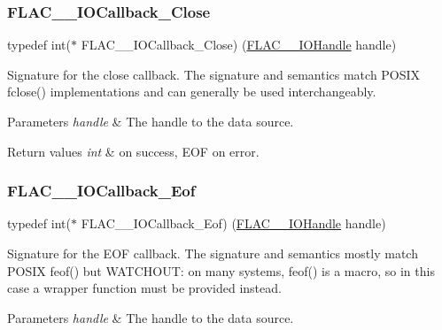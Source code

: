 \subsubsection{\texorpdfstring{F\+L\+A\+C\+\_\+\+\_\+\+I\+O\+Callback\+\_\+\+Close}{FLAC\_\_IOCallback\_Close}}
{\footnotesize\ttfamily typedef int($\ast$ F\+L\+A\+C\+\_\+\+\_\+\+I\+O\+Callback\+\_\+\+Close) (\hyperlink{group__flac__callbacks_ga4c329c3168dee6e352384c5e9306260d}{F\+L\+A\+C\+\_\+\+\_\+\+I\+O\+Handle} handle)}

Signature for the close callback. The signature and semantics match P\+O\+S\+IX fclose() implementations and can generally be used interchangeably.


\begin{DoxyParams}{Parameters}
{\em handle} & The handle to the data source. \\
\hline
\end{DoxyParams}

\begin{DoxyRetVals}{Return values}
{\em int} & {} on success, {\ttfamily E\+OF} on error. \\
\hline
\end{DoxyRetVals}
\mbox{\label{group__flac__callbacks_ga00ae3b3d373e691908e9539ebf720675}} 
\subsubsection{\texorpdfstring{F\+L\+A\+C\+\_\+\+\_\+\+I\+O\+Callback\+\_\+\+Eof}{FLAC\_\_IOCallback\_Eof}}
{\footnotesize\ttfamily typedef int($\ast$ F\+L\+A\+C\+\_\+\+\_\+\+I\+O\+Callback\+\_\+\+Eof) (\hyperlink{group__flac__callbacks_ga4c329c3168dee6e352384c5e9306260d}{F\+L\+A\+C\+\_\+\+\_\+\+I\+O\+Handle} handle)}

Signature for the E\+OF callback. The signature and semantics mostly match P\+O\+S\+IX feof() but W\+A\+T\+C\+H\+O\+UT\+: on many systems, feof() is a macro, so in this case a wrapper function must be provided instead.


\begin{DoxyParams}{Parameters}
{\em handle} & The handle to the data source. \\
\hline
\end{DoxyParams}

